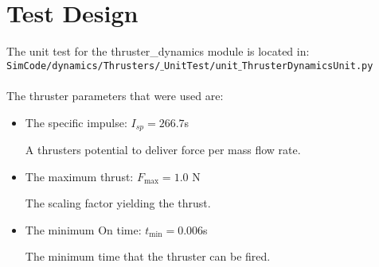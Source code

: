 \documentclass[]{BasiliskReportMemo}
\begin{document}
\section{Test Design}
The unit test for the thruster\_dynamics module is located in:\\

\noindent
{\tt SimCode/dynamics/Thrusters/$\_$UnitTest/unit$\_$ThrusterDynamicsUnit.py} \\
\\

The thruster parameters that were used are:

\begin{itemize}
\item The specific impulse: $I_{sp} = 266.7$s 

A thrusters potential to deliver force per mass flow rate. 
\item The maximum thrust: $F_{\mathrm{max}} = 1.0$ N

The scaling factor yielding the thrust.
\item The minimum On time: $t_{\mathrm{min}} = 0.006$s

The minimum time that the thruster can be fired.
\end{itemize}
\end{document}
